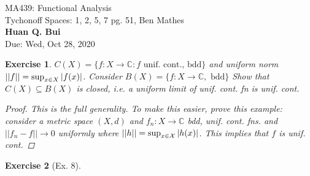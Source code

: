 \documentclass[11pt]{article}
\newtheorem{exercise}{Exercise}
\newcommand{\X}{\mathcal{X}}
\begin{document}
\begin{center}
\begin{framed}
{\Large  MA439: Functional Analysis\\
	 Tychonoff Spaces: 1, 2, 5, 7 pg. 51, Ben Mathes}\\
$\,$\\
{\Large \bf  Huan Q. Bui\\}
$\,$\\
{\Large Due: Wed, Oct 28, 2020}
\end{framed}
\end{center}



\begin{exercise}
	$C(X) = \{ f: X\to \mathbb{C} : f \text{ unif. cont., bdd} \}$ and uniform norm $|| f || = \sup_{x\in X} \abs{f(x)}$. Consider $B(X) = \{ f: X\to \mathbb{C}, \text{ bdd} \}$ Show that $C(X) \subseteq B(X)$ is closed, i.e. a uniform limit of unif. cont. fn is unif. cont.
	\begin{proof}
		This is the full generality. To make this easier, prove this example: consider a metric space $(X,d)$ and $f_n: X\to \mathbb{C}$ bdd, unif. cont. fns. and $|| f_n -f || \to 0$ uniformly where $|| h || = \sup_{x\in \X}\abs{h(x)}$. This implies that $f$ is unif. cont.  
	\end{proof}
\end{exercise}

\begin{exercise}[Ex. 8]
	
\end{exercise}
\end{document}
